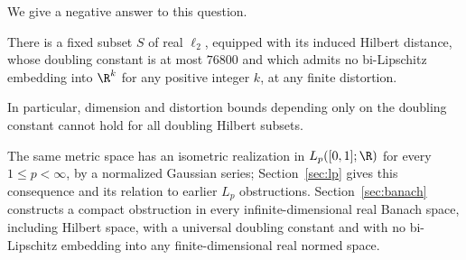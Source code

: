 We give a negative answer to this question.
\begin{theorem}\label{thm:main}
There is a fixed subset $S$ of real $\ell_2$, equipped with its induced Hilbert distance, whose doubling constant is at most $76800$ and which admits no bi-Lipschitz embedding into $\R^k$ for any positive integer $k$, at any finite distortion.
\end{theorem}
In particular, dimension and distortion bounds depending only on the doubling constant cannot hold for all doubling Hilbert subsets.

The same metric space has an isometric realization in $L_p([0,1];\R)$ for every $1\le p<\infty$, by a normalized Gaussian series; Section~\ref{sec:lp} gives this consequence and its relation to earlier $L_p$ obstructions. Section~\ref{sec:banach} constructs a compact obstruction in every infinite-dimensional real Banach space, including Hilbert space, with a universal doubling constant and with no bi-Lipschitz embedding into any finite-dimensional real normed space.

